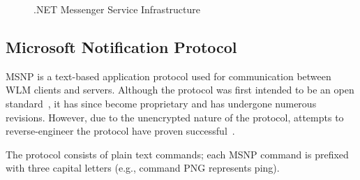 \documentclass{sig-alternate}
\begin{document}
\begin{figure}[h]
	\centering
	\caption{.NET Messenger Service Infrastructure}
	\label{fig:wlminfrastructure}
\end{figure}

\subsection{Microsoft Notification Protocol}

MSNP is a text-based application protocol used for communication between WLM clients and servers.
Although the protocol was first intended to be an open standard~\cite{fout:insidewlm}, it has since become proprietary and has undergone numerous revisions.
However, due to the unencrypted nature of the protocol, attempts to reverse-engineer the protocol have proven successful~\cite{hypothetic:msnp, msnfanatic:msnp}.

The protocol consists of plain text commands; each MSNP command is prefixed with three capital letters (e.g., command PNG represents ping).
\end{document}
